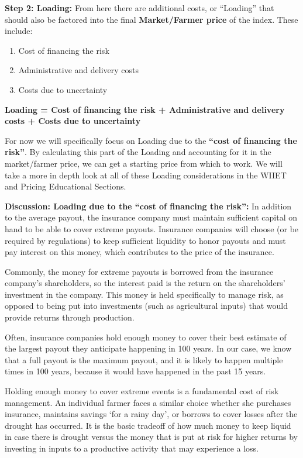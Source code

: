 \documentclass[letterpaper,10pt,english]{sphinxmanual}
\begin{document}
\textbf{Step 2: Loading:} From here there are additional costs, or ``Loading'' that should also be factored into the final \textbf{Market/Farmer price} of the index. These include:
\begin{enumerate}
\item {} 
Cost of financing the risk

\item {} 
Administrative and delivery costs

\item {} 
Costs due to uncertainty

\end{enumerate}

\textbf{Loading = Cost of financing the risk + Administrative and delivery costs + Costs due to uncertainty}

For now we will specifically focus on Loading due to the \textbf{``cost of financing the risk''}. By calculating this part of the Loading and accounting for it in the market/farmer price, we can get a starting price from which to work. We will take a more in depth look at all of these Loading considerations in the WIIET and Pricing Educational Sections.

\textbf{Discussion: Loading due to the ``cost of financing the risk'':} In addition to the average payout, the insurance company must maintain sufficient capital on hand to be able to cover extreme payouts. Insurance companies will choose (or be required by regulations) to keep sufficient liquidity to honor payouts and must pay interest on this money, which contributes to the price of the insurance.

Commonly, the money for extreme payouts is borrowed from the insurance company's shareholders, so the interest paid is the return on the shareholders' investment in the company. This money is held specifically to manage risk, as opposed to being put into investments (such as agricultural inputs) that would provide returns through production.

Often, insurance companies hold enough money to cover their best estimate of the largest payout they anticipate happening in 100 years. In our case, we know that a full payout is the maximum payout, and it is likely to happen multiple times in 100 years, because it would have happened in the past 15 years.

Holding enough money to cover extreme events is a fundamental cost of risk management. An individual farmer faces a similar choice whether she purchases insurance, maintains savings `for a rainy day', or borrows to cover losses after the drought has occurred. It is the basic tradeoff of how much money to keep liquid in case there is drought versus the money that is put at risk for higher returns by investing in inputs to a productive activity that may experience a loss.
\end{document}
